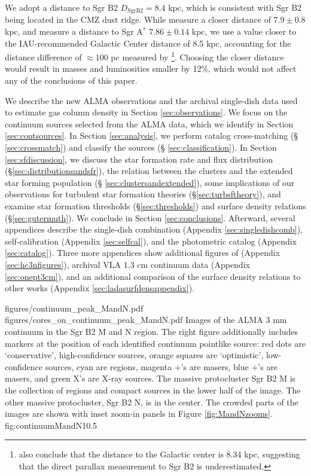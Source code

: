 \documentclass[twocolumn]{aastex61}
\newcommand{\dsgrb}{\ensuremath{8.4\textrm{~kpc}}\xspace}
\begin{document}
We adopt a distance to Sgr B2 $D_{\mathrm{Sgr B2}}=\dsgrb$, which is consistent
with Sgr B2 being located in the CMZ dust ridge.  While \citet{Reid2009a}
measure a closer distance of $7.9\pm0.8$ kpc, and \citet{Boehle2016a}
measure a distance to Sgr A$^*$ $7.86\pm0.14$ kpc, we use a value closer to the
IAU-recommended Galactic Center distance of 8.5 kpc, accounting for the
distance difference of $\approx100$ pc measured by
\citet{Reid2009a}\footnote{\citet{Reid2014a} also conclude that the distance to
the Galactic center is 8.34 kpc, suggesting that the direct parallax
measurement to Sgr B2 is underestimated.}.  Choosing the closer distance would
result in masses and luminosities smaller by 12\%, which would not affect any
of the conclusions of this paper.

We describe the new ALMA observations and the archival single-dish data used
to estimate gas column density in Section
\ref{sec:observations}. We focus on the continuum sources selected from the
ALMA data, which we identify in Section \ref{sec:contsources}.  In Section
\ref{sec:analysis}, we perform catalog cross-matching (\S
\ref{sec:crossmatch}) and classify the sources (\S
\ref{sec:classification}).  In Section \ref{sec:sfdiscussion}, we discuss the
star formation rate and flux distribution (\S \ref{sec:distributionsandsfr}),
the
relation between the clusters and the extended star forming population (\S
\ref{sec:clustersandextended}), some implications of our observations
for turbulent star formation theories (\S \ref{sec:turbsftheory}),
and examine star formation thresholds (\S \ref{sec:thresholds})
and surface density relations (\S \ref{sec:gutermuth}).   We conclude
in Section \ref{sec:conclusions}.  Afterward, several appendices describe the
single-dish combination (Appendix \ref{sec:singledishcomb}), self-calibration
(Appendix \ref{sec:selfcal}), and the photometric catalog (Appendix
\ref{sec:catalog}).  Three more appendices show additional figures of
\cyanoacetylene (Appendix \ref{sec:hc3nfigures}), archival VLA 1.3 cm continuum
data (Appendix \ref{sec:onept3cm}), and an additional comparison of the surface
density relations to other works (Appendix
\ref{sec:ladasurfdensappendix}).


\FigureTwo
{figures/continuum_peak_MandN.pdf}
{figures/cores_on_continuum_peak_MandN.pdf}
{Images of the ALMA 3 mm continuum in the Sgr B2 M and N region.  The right
figure additionally includes markers at the position of each identified
continuum pointlike source: red dots are `conservative', high-confidence
sources, orange squares are `optimistic', low-confidence sources, cyan are \hii
regions, magenta +'s are \methanol masers, blue +'s are \water masers, and
green X's are X-ray sources.  The massive
protocluster Sgr B2 M is the collection of \hii regions and compact sources in
the lower half of the image.  The other massive protocluster, Sgr B2 N, is in
the center.
The crowded parts of the images are shown with inset zoom-in panels in
Figure \ref{fig:MandNzooms}.
}
{fig:continuumMandN}{1}{0.5\textwidth}
\end{document}
